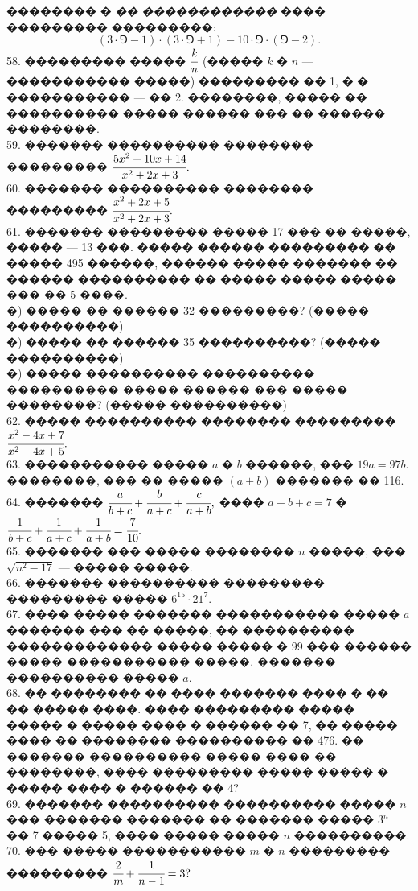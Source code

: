 \documentclass[12pt]{article}
\begin{document}
�������� � {\it �� ������������} ���� ��������� ���������:
$$(3\cdot\Game-1)\cdot(3\cdot\Game+1)-10\cdot\Game\cdot(\Game-2).$$
58. ��������� ����� $\cfrac{k}{n}$ (����� $k$ � $n$ --- ����������� �����) ��������� �� 1, � � ����������� --- �� 2. ��������, ����� �� ���������� ����� ������ ��� �� ������ ��������.\\
59. ������� ���������� �������� ��������� $\cfrac{5x^2+10x+14}{x^2+2x+3}.$\\
60. ������� ���������� �������� ��������� $\cfrac{x^2+2x+5}{x^2+2x+3}.$\\
61. ������� ��������� ����� 17 ��� �� �����, ����� --- 13 ���. ����� ������ ��������� �� ����� 495 ������, ������ ����� ������� �� ������ ���������� �� ����� ����� ����� ��� �� 5 ����.\\
�) ����� �� ������ 32 ���������? (����� ����������)\\
�) ����� �� ������ 35 ����������? (����� ����������)\\
�) ����� ���������� ���������� ���������� ����� ������ ��� ����� ��������? (����� ����������)\\
62. ����� ���������� �������� ��������� $\cfrac{x^2-4x+7}{x^2-4x+5}.$\\
63. ����������� ����� $a$ � $b$ ������, ��� $19a=97b.$ ��������, ��� �� ����� $(a+b)$ ������� �� 116.\\
64. ������� $\cfrac{a}{b+c}+\cfrac{b}{a+c}+\cfrac{c}{a+b},$ ���� $a+b+c=7$ � $\cfrac{1}{b+c}+\cfrac{1}{a+c}+\cfrac{1}{a+b}=\cfrac{7}{10}.$\\
65. ������� ��� ����� �������� $n$ �����, ��� $\sqrt{n^2-17}$ --- ����� �����.\\
66. ������� ���������� ��������� ��������� ����� $6^{15}\cdot21^{7}.$\\
67. ���� ����� ������� ����������� ����� $a$ ������� ��� �� �����, �� ���������� ������������� ����� ����� � 99 ��� ������ ����� ����������� �����. ������� ���������� ����� $a.$\\
68. �� �������� �� ���� ������� ���� � �� �� ����� ����. ���� ��������� ����� ����� � ����� ���� � ������ �� 7, �� ����� ���� �� �������� ���������� �� 476. �� ������� ���������� ����� ���� �� ��������, ���� ��������� ����� ����� � ����� ���� � ������ �� 4?\\
69. ������� ���������� ���������� ����� $n$ ��� ������� ������� �� ������� ����� $3^n$ �� 7 ����� 5, ���� ����� ����� $n$ ����������.\\
70. ��� ����� ����������� $m$ � $n$ ��������� ��������� $\cfrac{2}{m}+\cfrac{1}{n-1}=3?$\\
\end{document}
